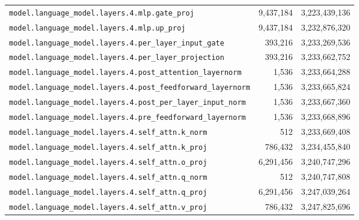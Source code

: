 \documentclass[10pt,a4paper]{article}
\theoremstyle{definition}
\begin{document}
\begin{appendices}
\begin{longtable}{p{9.5cm}rr}
\texttt{model.\allowbreak{}language\_model.\allowbreak{}layers.\allowbreak{}4.\allowbreak{}mlp.\allowbreak{}gate\_proj} & 9,437,184 & 3,223,439,136 \\
\texttt{model.\allowbreak{}language\_model.\allowbreak{}layers.\allowbreak{}4.\allowbreak{}mlp.\allowbreak{}up\_proj} & 9,437,184 & 3,232,876,320 \\
\texttt{model.\allowbreak{}language\_model.\allowbreak{}layers.\allowbreak{}4.\allowbreak{}per\_layer\_input\_gate} & 393,216 & 3,233,269,536 \\
\texttt{model.\allowbreak{}language\_model.\allowbreak{}layers.\allowbreak{}4.\allowbreak{}per\_layer\_projection} & 393,216 & 3,233,662,752 \\
\texttt{model.\allowbreak{}language\_model.\allowbreak{}layers.\allowbreak{}4.\allowbreak{}post\_attention\_layernorm} & 1,536 & 3,233,664,288 \\
\texttt{model.\allowbreak{}language\_model.\allowbreak{}layers.\allowbreak{}4.\allowbreak{}post\_feedforward\_layernorm} & 1,536 & 3,233,665,824 \\
\texttt{model.\allowbreak{}language\_model.\allowbreak{}layers.\allowbreak{}4.\allowbreak{}post\_per\_layer\_input\_norm} & 1,536 & 3,233,667,360 \\
\texttt{model.\allowbreak{}language\_model.\allowbreak{}layers.\allowbreak{}4.\allowbreak{}pre\_feedforward\_layernorm} & 1,536 & 3,233,668,896 \\
\texttt{model.\allowbreak{}language\_model.\allowbreak{}layers.\allowbreak{}4.\allowbreak{}self\_attn.\allowbreak{}k\_norm} & 512 & 3,233,669,408 \\
\texttt{model.\allowbreak{}language\_model.\allowbreak{}layers.\allowbreak{}4.\allowbreak{}self\_attn.\allowbreak{}k\_proj} & 786,432 & 3,234,455,840 \\
\texttt{model.\allowbreak{}language\_model.\allowbreak{}layers.\allowbreak{}4.\allowbreak{}self\_attn.\allowbreak{}o\_proj} & 6,291,456 & 3,240,747,296 \\
\texttt{model.\allowbreak{}language\_model.\allowbreak{}layers.\allowbreak{}4.\allowbreak{}self\_attn.\allowbreak{}q\_norm} & 512 & 3,240,747,808 \\
\texttt{model.\allowbreak{}language\_model.\allowbreak{}layers.\allowbreak{}4.\allowbreak{}self\_attn.\allowbreak{}q\_proj} & 6,291,456 & 3,247,039,264 \\
\texttt{model.\allowbreak{}language\_model.\allowbreak{}layers.\allowbreak{}4.\allowbreak{}self\_attn.\allowbreak{}v\_proj} & 786,432 & 3,247,825,696 \\

\end{longtable}
\end{appendices}
\end{document}
